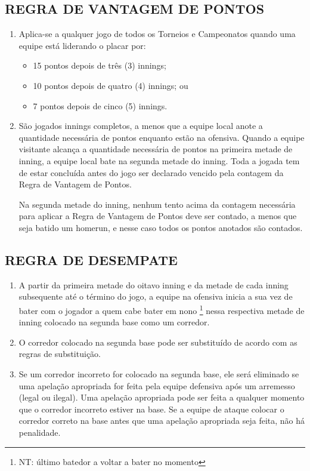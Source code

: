 \subsection{REGRA DE VANTAGEM DE PONTOS}
\begin{enumerate}[label=(\alph*)]
	\item Aplica-se a qualquer jogo de todos os Torneios e Campeonatos quando uma  equipe está liderando o placar por:
	\begin{itemize}
		\item 15 pontos depois de três (3) \glspl{inning};
		\item 10 pontos depois de quatro (4) \glspl{inning}; ou
		\item 7 pontos depois de cinco (5) \glspl{inning}.
	\end{itemize}
	\item São jogados \glspl{inning} completos, a menos que a equipe local anote a  quantidade necessária de pontos enquanto estão na ofensiva. Quando a equipe visitante alcança a quantidade necessária de pontos na primeira metade de \gls{inning}, a equipe local bate na segunda metade do \gls{inning}. Toda a jogada tem de estar concluída antes do jogo ser declarado vencido pela contagem da Regra de Vantagem de Pontos.

	Na segunda metade do \gls{inning}, nenhum tento acima  da contagem necessária para aplicar a Regra de Vantagem de Pontos deve ser contado, a menos que seja batido um \gls{homerun}, e nesse caso todos os pontos anotados são contados.
\end{enumerate}

\subsection{REGRA DE DESEMPATE}
\begin{enumerate}[label=(\alph*)]
	\item A partir da primeira metade do oitavo \gls{inning} e da metade de cada \gls{inning} subsequente até o término do jogo, a equipe na ofensiva inicia a sua vez de bater com o jogador a quem cabe bater em nono \footnote{NT: último batedor a voltar a bater no momento} nessa respectiva metade de \gls{inning} colocado na segunda base como um corredor.
	\item  O corredor colocado na segunda base pode ser substituído de acordo com as regras de substituição.
	\item  Se um corredor incorreto for colocado na segunda base, ele será eliminado se uma apelação apropriada for feita pela equipe defensiva após um arremesso (legal ou ilegal). Uma apelação apropriada pode ser feita a  qualquer momento que o corredor incorreto estiver na base. Se a equipe de ataque colocar o corredor correto na base antes que uma apelação apropriada seja feita, não há penalidade.
\end{enumerate}


